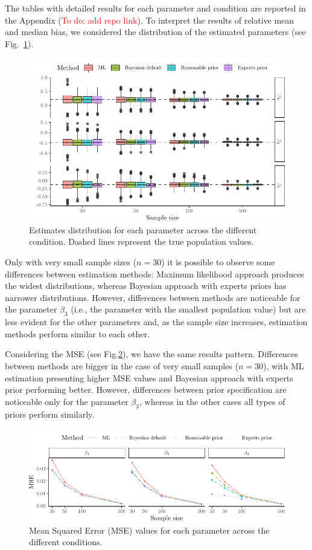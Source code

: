 \documentclass[graybox]{svmult}
\newcommand{\todo}[1]{(\textcolor{red}{To do: #1})}
\begin{document}
The tables with detailed results for each parameter and condition are reported in the Appendix \todo{add repo link}. To interpret the results of relative mean and median bias, we considered the distribution of the estimated parameters (see Fig.~\ref{fig:boxplots}).
\begin{figure}[t]
	\sidecaption
	\includegraphics[width = 1\textwidth]{figure/Plot_boxplots}
	\caption{Estimates distribution for each parameter across the different condition. Dashed lines represent the true population values.}
	\label{fig:boxplots}
\end{figure}
Only with very small sample sizes ($n=30$) it is possible to observe some differences between estimation methods: Maximum likelihood approach produces the widest distributions, whereas Bayesian approach with experts priors has narrower distributions. However, differences between methods are noticeable for the parameter $\beta_3$ (i.e., the parameter with the smallest population value) but are less evident for the other parameters and, as the sample size increases, estimation methods perform similar to each other.

Considering the MSE (see Fig.\ref{fig:mse}), we have the same results pattern. Differences between methods are bigger in the case of very small samples ($n=30$), with ML estimation presenting higher MSE values and Bayesian approach with experts prior performing better. However, differences between prior specification are noticeable only for the parameter $\beta_3$, whereas in the other cases all types of priors perform similarly.
\begin{figure}[b]
	\sidecaption
	\includegraphics[width = 1\textwidth]{figure/Plot_MSE}
	\caption{Mean Squared Error (MSE) values for each parameter across the different conditions.}
	\label{fig:mse}
\end{figure}
\end{document}
